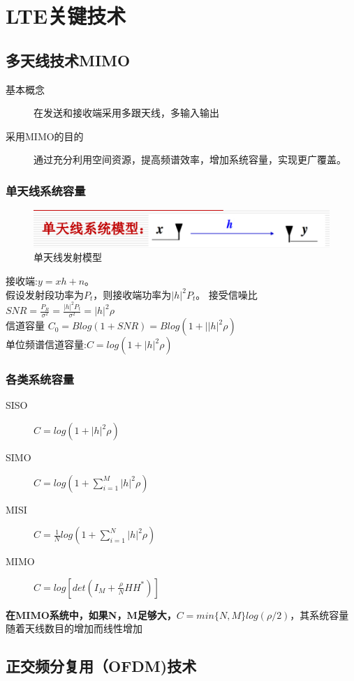 \documentclass{report}
\begin{document}
	\section{LTE关键技术}
	\subsection{多天线技术MIMO}
	\begin{description}
		\item[基本概念] 在发送和接收端采用多跟天线，多输入输出
		\item[采用MIMO的目的] 通过充分利用空间资源，提高频谱效率，增加系统容量，实现更广覆盖。
	\end{description}
	\subsubsection{单天线系统容量}
	\begin{figure}[H]
		\centering
		\includegraphics[width=0.7\linewidth]{单天线发射模型}
		\caption{单天线发射模型}
		\label{fig:}
	\end{figure}
	接收端:\(y = xh+n\)。\\
	假设发射段功率为$P_t$，则接收端功率为$|h|^2P_t$。
	接受信噪比$SNR = \frac{P_R}{\sigma^2}=\frac{|h|^2P_t}{\sigma^2}=|h|^2\rho$\\
	信道容量 $C_0 = Blog(1+SNR) = Blog(1+||h|^2\rho)$ \\
	单位频谱信道容量:$C = log(1+|h|^2\rho)$	\\
	\subsubsection{各类系统容量}
	\begin{description}
		\item[SISO] $C = log(1+|h|^2\rho)$
		\item[SIMO] $C = log(1+\sum_{i = 1}^{M}|h|^2\rho)$
		\item[MISI] $C = \frac{1}{N}log(1+\sum_{i = 1}^{N}|h|^2\rho)$
		\item[MIMO] $C = log[det(I_M+\frac{\rho}{N}HH^{*})]$
	\end{description}
	\textbf{在MIMO系统中，如果N，M足够大，$C = min\{N,M\}log(\rho/2)$}，其系统容量随着天线数目的增加而线性增加
	\subsection{正交频分复用（OFDM)技术}
\end{document}
